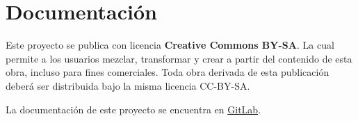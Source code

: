 \chapter{Documentación}\label{cap:documentación}

	Este proyecto se publica con licencia \textbf{Creative Commons BY-SA}. La cual permite a los usuarios mezclar, transformar y crear a partir del contenido de esta obra, incluso para fines comerciales. Toda obra derivada de esta publicación deberá ser distribuida bajo la misma licencia CC-BY-SA.\par
	
	La documentación de este proyecto se encuentra en \href{https://gitlab.com/emablanco/trabajo-final-tusl}{\color{blue}GitLab}.\par